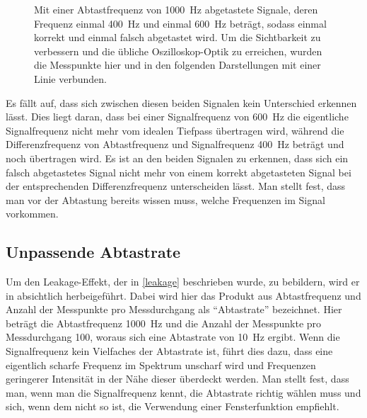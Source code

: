 \documentclass[
a4paper,
12pt,
pagesize,
ngerman
]{scrartcl}
\begin{document}
\begin{figure}[H]
		\caption{Mit einer Abtastfrequenz von \SI{1000}{\hertz} abgetastete Signale, deren Frequenz einmal \SI{400}{\hertz} und einmal \SI{600}{\hertz} beträgt, sodass einmal korrekt und einmal falsch abgetastet wird. Um die Sichtbarkeit zu verbessern und die übliche Oszilloskop-Optik zu erreichen, wurden die Messpunkte hier und in den folgenden Darstellungen mit einer Linie verbunden.} %
		\label{fig_ali}
		\centering
	\end{figure}
	
	Es fällt auf, dass sich zwischen diesen beiden Signalen kein Unterschied erkennen lässt.
	Dies liegt daran, dass bei einer Signalfrequenz von \SI{600}{\hertz} die eigentliche Signalfrequenz nicht mehr vom idealen Tiefpass übertragen wird, während die Differenzfrequenz von Abtastfrequenz und Signalfrequenz \SI{400}{\hertz} beträgt und noch übertragen wird.
	Es ist an den beiden Signalen zu erkennen, dass sich ein falsch abgetastetes Signal nicht mehr von einem korrekt abgetasteten Signal bei der entsprechenden Differenzfrequenz unterscheiden lässt.
	Man stellt fest, dass man vor der Abtastung bereits wissen muss, welche Frequenzen im Signal vorkommen. 
	
	\subsection{Unpassende Abtastrate}
	Um den Leakage-Effekt, der in \cref{leakage} beschrieben wurde, zu bebildern, wird er in  absichtlich herbeigeführt.
	Dabei wird hier das Produkt aus Abtastfrequenz und Anzahl der Messpunkte pro Messdurchgang als \enquote{Abtastrate} bezeichnet. %
	Hier beträgt die Abtastfrequenz \SI{1000}{\hertz} und die Anzahl der Messpunkte pro Messdurchgang \num{100}, woraus sich eine Abtastrate von \SI{10}{\hertz} ergibt.
	Wenn die Signalfrequenz kein Vielfaches der Abtastrate ist, führt dies dazu, dass eine eigentlich scharfe Frequenz im Spektrum unscharf wird und Frequenzen geringerer Intensität in der Nähe dieser überdeckt werden.
	Man stellt fest, dass man, wenn man die Signalfrequenz kennt, die Abtastrate richtig wählen muss und sich, wenn dem nicht so ist, die Verwendung einer Fensterfunktion empfiehlt.
	
\end{document}

